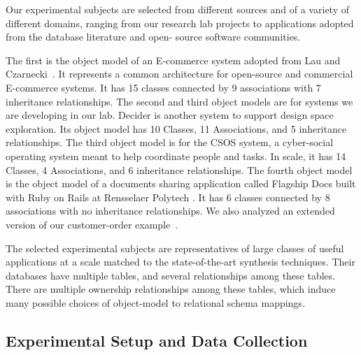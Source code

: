 \documentclass{sig-alternate}
\begin{document}
Our experimental subjects are selected from different sources and of a variety of different domains, ranging from our research lab projects to applications adopted from the database literature and open- source software communities. 

The first is the object model of an E-commerce system adopted from Lau and Czarnecki~\cite{sean_quan_lau_domain_2006}. It represents a common architecture for open-source and commercial E-commerce systems. It has 15 classes connected by 9 associations with 7 inheritance relationships. The second and third object models are for systems we are developing in our lab. Decider is another system to support design space exploration. Its object model has 10 Classes, 11 Associations, and 5 inheritance relationships. The third object model is for the CSOS system, a  cyber-social operating system meant to help coordinate people and tasks. In scale, it has 14 Classes, 4 Associations, and 6 inheritance relationships.  
The fourth object model is the object model of a documents sharing application called Flagship Docs built with Ruby on Rails at Rensselaer Polytech \cite{FlagshipDocs4}. It has 6 classes connected by 8 associations with no inheritance relationships. We also analyzed an extended version of our customer-order example~\cite{trademaker}.
 

The selected experimental subjects are representatives of large classes of useful applications at a scale matched to the state-of-the-art synthesis techniques. Their databases have multiple tables, and several relationships among these tables. There are multiple ownership relationships among these tables, which induce many possible choices of object-model to relational schema mappings.

 

\subsection{Experimental Setup and Data Collection}

\end{document}
